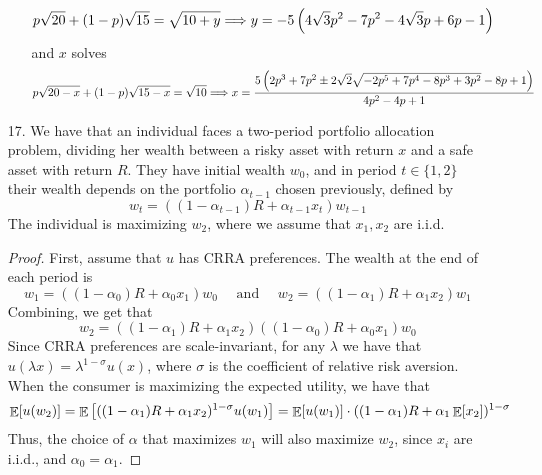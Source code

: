 \documentclass[12pt]{article}
\begin{document}
\begin{itemize}
\begin{itemize}
		\[
		p \sqrt{20} + (1-p)\sqrt{15} = \sqrt{10 + y} \Longrightarrow y = -5\left( 4\sqrt{3} p^2 - 7p^2 - 4\sqrt{3}p + 6p - 1\right)
		\]
		and $x$ solves
		\[
		p \sqrt{20 - x} + (1-p)\sqrt{15 - x} = \sqrt{10} \Longrightarrow x = \frac{5\left( 2p^3 + 7p^2 \pm 2\sqrt{2}\sqrt{-2p^5 + 7p^4 - 8p^3 + 3p^2} - 8p+1\right)}{4p^2-4p+1}
		\]
	\end{itemize}
	\item[17.] We have that an individual faces a two-period portfolio allocation problem, dividing her wealth between a risky asset with return $x$ and a safe asset with return $R$. They have initial wealth $w_0$, and in period $t \in \{1,2\}$ their wealth depends on the portfolio $\alpha_{t-1}$ chosen previously, defined by
	\[
	w_t = ((1-\alpha_{t-1})R + \alpha_{t-1}x_t)w_{t-1}
	\]
	The individual is maximizing $w_2$, where we assume that $x_1,x_2$ are i.i.d. 
	
	\begin{proof}
		First, assume that $u$ has CRRA preferences. The wealth at the end of each period is 
		\[
		w_1 = ((1-\alpha_{0})R + \alpha_{0}x_1)w_{0} \quad \text{ and }\quad w_2 = ((1-\alpha_{1})R + \alpha_{1}x_2)w_{1}
		\]
		Combining, we get that
		\[
		w_2 = ((1-\alpha_{1})R + \alpha_{1}x_2)((1-\alpha_{0})R + \alpha_{0}x_1)w_{0}
		\]
		Since CRRA preferences are scale-invariant, for any $\lambda$ we have that $u(\lambda x) = \lambda^{1-\sigma} u(x)$, where $\sigma$ is the coefficient of relative risk aversion. When the consumer is maximizing the expected utility, we have that
		\[
		\mathop{\mathbb{E}}[u(w_2)] = \mathop{\mathbb{E}}\left[ ((1-\alpha_{1})R + \alpha_{1}x_2)^{1-\sigma} u(w_1)\right] = \mathop{\mathbb{E}}[u(w_1)] \cdot ((1-\alpha_{1})R + \alpha_{1}\mathop{\mathbb{E}}[x_2])^{1-\sigma}
		\]
		Thus, the choice of $\alpha$ that maximizes $w_1$ will also maximize $w_2$, since $x_i$ are i.i.d., and $\alpha_0 = \alpha_1$.
		

\end{proof}
\end{itemize}
\end{document}
